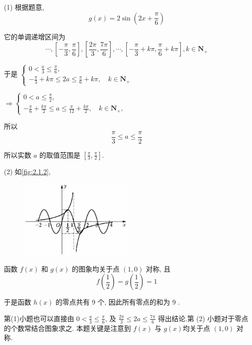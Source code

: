 \begin{solution}
	(1) 根据题意,
	$$
		g(x)=2 \sin \left(2 x+\frac{\pi}{6}\right)
	$$

	它的单调递增区间为
	$$
		\cdots,\left[-\frac{\pi}{3}, \frac{\pi}{6}\right],\left[\frac{2 \pi}{3}, \frac{7 \pi}{6}\right], \cdots,\left[-\frac{\pi}{3}+k \pi, \frac{\pi}{6}+k \pi\right], k \in \mathbf{N}_{+}
	$$

	于是 $\left\{\begin{array}{l}0<\frac{a}{3} \leqslant \frac{\pi}{6}, \\ -\frac{\pi}{3}+k \pi \leqslant 2 a \leqslant \frac{\pi}{6}+k \pi, \quad k \in \mathbf{N}_{+}\end{array}\right. $

	$\Rightarrow\left\{\begin{array}{l}0<a \leqslant \frac{\pi}{2}, \\ -\frac{\pi}{6}+\frac{k \pi}{2} \leqslant a \leqslant \frac{\pi}{12}+\frac{k \pi}{2}, \quad k \in \mathbf{N}_{+},\end{array}\right.$

	所以
	$$
		\frac{\pi}{3} \leqslant a \leqslant \frac{\pi}{2}
	$$

	所以实数 $a$ 的取值范围是 $\left[\frac{\pi}{3}, \frac{\pi}{2}\right]$.

	(2) 如\autoref{fig:2.1.2},
	\begin{figure}[ht]
		\centering
		\includegraphics[width=0.5\textwidth]{./images/2.1.2.jpg}
		\caption{}
		\label{fig:2.1.2}
	\end{figure}

	函数 $f(x)$ 和 $g(x)$ 的图象均关于点 $(1,0)$ 对称, 且
	$$
		f\left(\frac{1}{2}\right)=g\left(\frac{1}{2}\right)=1
	$$

	于是函数 $h(x)$ 的零点共有 9 个, 因此所有零点的和为 9 .
\end{solution}

\begin{note}
	第(1)小题也可以直接由 $0<\frac{a}{3} \leqslant \frac{\pi}{6}$, 及 $\frac{2 \pi}{3} \leqslant 2 a \leqslant \frac{7 \pi}{6}$ 得出结论.第 (2) 小题对于零点的个数常结合图象求之. 本题关键是注意到 $f(x)$ 与 $g(x)$均关于点 $(1,0)$ 对称.
\end{note}

